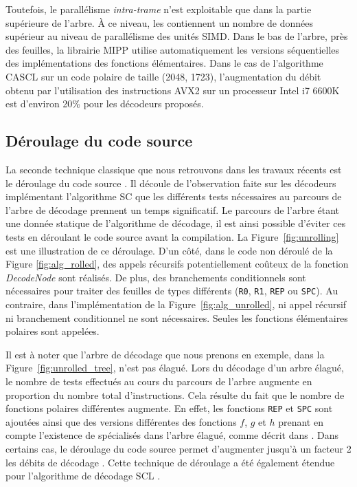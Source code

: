 Toutefois, le parallélisme \textit{intra-trame} n'est exploitable que dans la partie supérieure de l'arbre. \`A ce niveau, les \noeuds contiennent un nombre de données supérieur au niveau de parallélisme des unités SIMD. Dans le bas de l'arbre, près des feuilles, la librairie MIPP \cite{cassagne_efficient_2015} utilise automatiquement les versions séquentielles des implémentations des fonctions élémentaires. Dans le cas de l'algorithme CASCL sur un code polaire de taille (2048, 1723), l'augmentation du débit obtenu par l'utilisation des instructions AVX2 sur un processeur Intel i7 6600K est d'environ 20\% pour les décodeurs proposés.

\subsection{Déroulage du code source}
\label{subsec:unroll}
La seconde technique classique que nous retrouvons dans les travaux récents est le déroulage du code source \cite{sarkis_autogenerating_2014,giard_fast_2014,cassagne_efficient_2015,cassagne_energy_2016}. Il découle de l'observation faite sur les décodeurs implémentant l'algorithme SC que les différents tests nécessaires au parcours de l'arbre de décodage prennent un temps significatif. Le parcours de l'arbre étant une donnée statique de l'algorithme de décodage, il est ainsi possible d'éviter ces tests en \og déroulant \fg le code source avant la compilation. La Figure~\ref{fig:unrolling} est une illustration de ce déroulage. D'un côté, dans le code non déroulé de la Figure \ref{fig:alg_rolled}, des appels récursifs potentiellement coûteux de la fonction \textit{DecodeNode} sont réalisés. De plus, des branchements conditionnels sont nécessaires pour traiter des feuilles de types différents (\texttt{R0}, \texttt{R1}, \texttt{REP} ou \texttt{SPC}). Au contraire, dans l'implémentation de la Figure~\ref{fig:alg_unrolled}, ni appel récursif ni branchement conditionnel ne sont nécessaires. Seules les fonctions élémentaires polaires sont appelées.

Il est à noter que l'arbre de décodage que nous prenons en exemple, dans la Figure~\ref{fig:unrolled_tree}, n'est pas élagué. Lors du décodage d'un arbre élagué, le nombre de tests effectués au cours du parcours de l'arbre augmente en proportion du nombre total d'instructions. Cela résulte du fait que le nombre de fonctions polaires différentes augmente. En effet, les fonctions \texttt{REP} et \texttt{SPC} sont ajoutées ainsi que des versions différentes des fonctions $f$, $g$ et $h$ prenant en compte l'existence de \noeuds spécialisés dans l'arbre élagué, comme décrit dans \cite{sarkis_fast_2014,cassagne_efficient_2015}. Dans certains cas, le déroulage du code source permet d'augmenter jusqu'à un facteur 2 les débits de décodage \cite{sarkis_autogenerating_2014}. Cette technique de déroulage a été également étendue pour l'algorithme de décodage SCL \cite{sarkis_fast_2016}.

